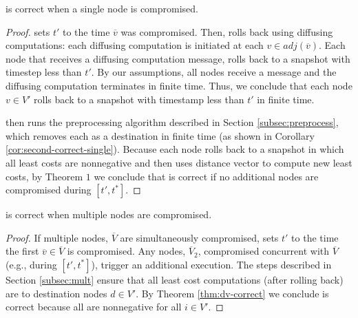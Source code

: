 \begin{corollary}
\label{cor:cpr-correct-single}
\cpr is correct when a single node is compromised.
\end{corollary}
\begin{proof}
\cpr sets $t'$ to the time $\overline{v}$ was compromised. Then, \cpr rolls back using diffusing computations: each diffusing computation is initiated at each $v \in adj(\overline{v})$.
Each node that receives a diffusing computation message, rolls back to a snapshot with timestep less than $t'$.
By our assumptions, all nodes receive a message and the diffusing computation terminates in finite time.  Thus, we conclude
that each node $v \in V'$ rolls back to a snapshot with timestamp less than $t'$ in finite time.

\cpr then runs the preprocessing algorithm described in Section \ref{subsec:preprocess}, which removes each \bad as a destination in finite time (as shown
in Corollary \ref{cor:second-correct-single}). Because each node rolls back to a snapshot in which all least costs are nonnegative and 
\cpr then uses distance vector to compute new least costs, by Theorem $1$ we conclude that \cpr is correct if no additional nodes are compromised during  $[t',t^*]$.
\end{proof}

\begin{corollary}
\label{cor:cpr-correct-mult}
\cpr is correct when multiple nodes are compromised.
\end{corollary}
\begin{proof}
If multiple nodes, $\overline{V}$ are simultaneously compromised, \cpr sets $t'$ to the time the first $\overline{v} \in \overline{V}$ is compromised.  Any nodes, $\overline{V}_2$, compromised
concurrent with $\overline{V}$ (e.g., during  $[t',t^*]$), trigger an additional \cpr execution.  The steps described in Section \ref{subsec:mult} ensure 
that all least cost computations (after rolling back) are to
destination nodes $d \in V'$.  By Theorem \ref{thm:dv-correct} we conclude \cpr is correct because all \dmatrixi are nonnegative for all $i \in V'$.
\end{proof}







